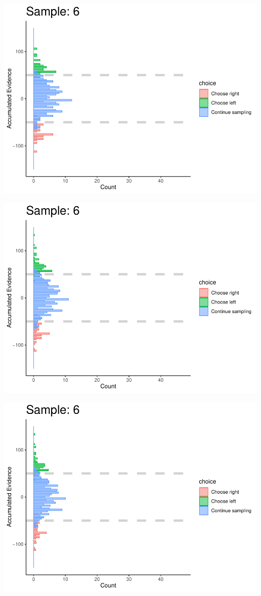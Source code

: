 \documentclass[
]{book}
\begin{document}
\begin{center}\includegraphics[width=0.8\linewidth]{LateNightBayes_files/figure-latex/fixed_check-55} \end{center}

\begin{center}\includegraphics[width=0.8\linewidth]{LateNightBayes_files/figure-latex/fixed_check-56} \end{center}

\begin{center}\includegraphics[width=0.8\linewidth]{LateNightBayes_files/figure-latex/fixed_check-57} \end{center}
\end{document}
